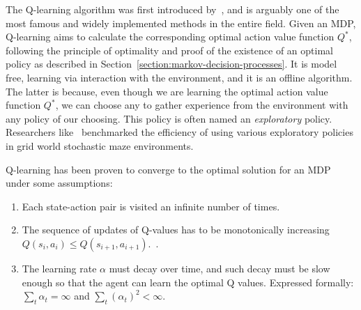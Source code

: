 \documentclass{../main.tex}{subfiles}
\begin{document}
The Q-learning algorithm was first introduced by~\cite{Watkins1989}, and is arguably one of the most famous and widely implemented methods in the entire field. Given an MDP, Q-learning aims to calculate the corresponding optimal action value function $Q^*$, following the principle of optimality and proof of the existence of an optimal policy as described in Section~\ref{section:markov-decision-processes}. It is model free, learning via interaction with the environment, and it is an offline algorithm. The latter is because, even though we are learning the optimal action value function $Q^*$, we can choose any to gather experience from the environment with any policy of our choosing. This policy is often named an \textit{exploratory} policy. Researchers like~\cite{Tijsma2017} benchmarked the efficiency of using various exploratory policies in grid world stochastic maze environments.

Q-learning has been proven to converge to the optimal solution for an MDP under some assumptions:
\begin{enumerate}
\item Each state-action pair is visited an infinite number of times.~\citep{Watkins1989}
\item The sequence of updates of Q-values has to be monotonically increasing  $Q(s_i, a_i) \leq Q(s_{i+1}, a_{i+1})$.~\citep{Thrun1993}.
\item The learning rate $\alpha$  must decay over time, and such decay must be slow enough so that the agent can learn the optimal Q values. Expressed formally: $\sum_{t} \alpha_t = \infty$ and $\sum_{t} {(\alpha_{t})}^{2} < \infty$.~\citep{Watkins1989}
\end{enumerate}
  

\end{document}
